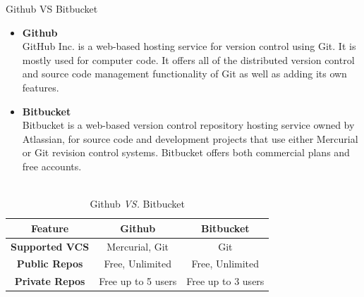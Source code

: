 \documentclass[
 size=12pt,
 paper=smartboard, %
 mode=present, %
 display=slides, %
style=tuliplab,
pauseslide,
fleqn,leqno]{powerdot}
\begin{document}
\begin{slide}{Github VS Bitbucket}	
	\begin{itemize}
		\item \textbf{Github}\\ 
		GitHub Inc. 
		is a web-based hosting service for version control using Git. 
		It is mostly used for computer code. 
		It offers all of the distributed version control and source code management 
		functionality of Git as well as adding its own features.
		
		\item \textbf{Bitbucket}\\
		Bitbucket is a web-based version control repository 
		hosting service owned by Atlassian, 
		for source code and development projects that use either 
		Mercurial or Git revision control systems. 
		Bitbucket offers both commercial plans and free accounts.\\~\\
	\end{itemize}
	\begin{table}
		\caption{Github \textit{VS.} Bitbucket}\label{GithubvsBitbucket}
		\begin{tabular}{ c | c | c }
			\toprule
			\textbf{Feature}  & \textbf{Github} & \textbf{Bitbucket}\\
			\midrule
			\textbf{Supported VCS}
			&  Mercurial, Git   
			&  Git \\
			\textbf{Public Repos}
			&  Free, Unlimited
			&  Free, Unlimited \\
			\textbf{Private Repos}
			&  Free up to 5 users
			&  Free up to 3 users \\
			\bottomrule
		\end{tabular}
	\end{table}
\end{slide}
\end{document}
